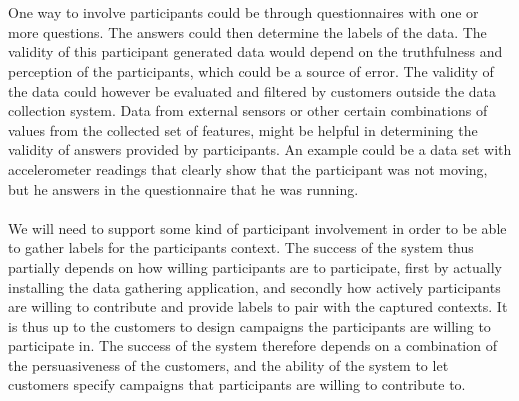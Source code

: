 \\\\
One way to involve participants could be through questionnaires with one or more questions. The answers could then determine the labels of the data. The validity of this participant generated data would depend on the truthfulness and perception of the participants, which could be a source of error. The validity of the data could however be evaluated and filtered by customers outside the data collection system. Data from external sensors or other certain combinations of values from the collected set of features, might be helpful in determining the validity of answers provided by participants. An example could be a data set with accelerometer readings that clearly show that the participant was not moving, but he answers in the questionnaire that he was running. 
\\\\
We will need to support some kind of participant involvement in order to be able to gather labels for the participants context. The success of the system thus partially depends on how willing participants are to participate, first by actually installing the data gathering application, and secondly how actively participants are willing to contribute and provide labels to pair with the captured contexts. It is thus up to the customers to design campaigns the participants are willing to participate in. The success of the system therefore depends on a combination of the persuasiveness of the customers, and the ability of the system to let customers specify campaigns that participants are willing to contribute to.
